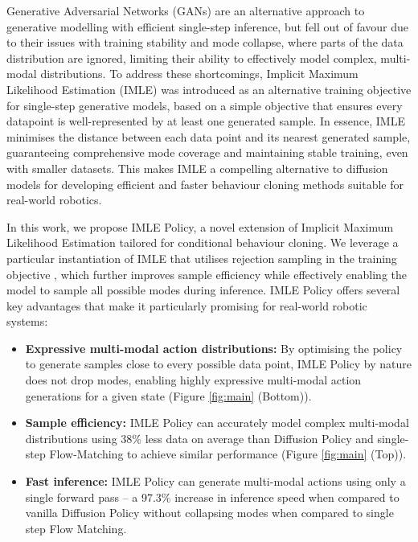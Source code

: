 Generative Adversarial Networks (GANs) are an alternative approach to generative modelling with efficient single-step inference, but fell out of favour due to their issues with training stability and mode collapse, where parts of the data distribution are ignored, limiting their ability to effectively model complex, multi-modal distributions. To address these shortcomings, Implicit Maximum Likelihood Estimation (IMLE) \cite{imle} was introduced as an alternative training objective for single-step generative models, based on a simple objective that ensures every datapoint is well-represented by at least one generated sample. In essence, IMLE minimises the distance between each data point and its nearest generated sample, guaranteeing comprehensive mode coverage and maintaining stable training, even with smaller datasets. This makes IMLE a compelling alternative to diffusion models for developing efficient and faster behaviour cloning methods suitable for real-world robotics. 

In this work, we propose IMLE Policy, a novel extension of Implicit Maximum Likelihood Estimation tailored for conditional behaviour cloning.
We leverage a particular instantiation of IMLE that utilises rejection sampling in the training objective \cite{rsimle}, which further improves sample efficiency while effectively enabling the model to sample all possible modes during inference. IMLE Policy offers several key advantages that make it particularly promising for real-world robotic systems:

\begin{itemize}
    \item \textbf{Expressive multi-modal action distributions:} 
    By optimising the policy to generate samples close to every possible data point, IMLE Policy by nature does not drop modes, enabling highly expressive multi-modal action generations for a given state (Figure \ref{fig:main} (Bottom)).

    \item \textbf{Sample efficiency:} IMLE Policy can accurately model complex multi-modal distributions using 38\% less data on average than Diffusion Policy and single-step Flow-Matching to achieve similar performance (Figure \ref{fig:main} (Top)).

    \item \textbf{Fast inference:} IMLE Policy can generate multi-modal actions using only a single forward pass -- a 97.3\% increase in inference speed when compared to vanilla Diffusion Policy without collapsing modes when compared to single step Flow Matching.
    
\end{itemize}



